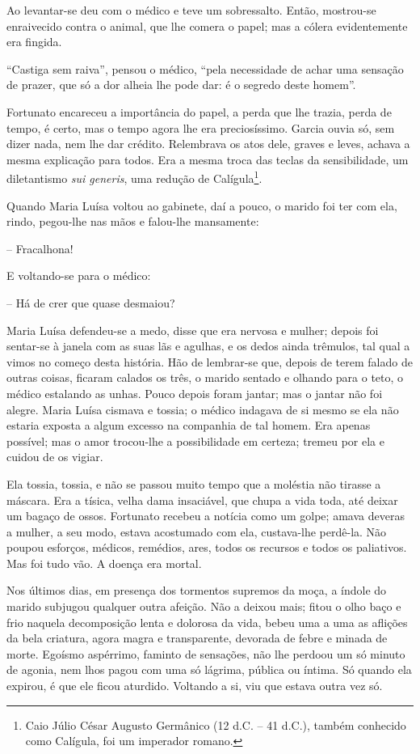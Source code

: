 Ao levantar-se deu com o médico e teve um sobressalto. Então, mostrou-se
enraivecido contra o animal, que lhe comera o papel; mas a cólera
evidentemente era fingida.

``Castiga sem raiva'', pensou o médico, ``pela necessidade de achar uma
sensação de prazer, que só a dor alheia lhe pode dar: é o segredo deste
homem''.

Fortunato encareceu a importância do papel, a perda que lhe trazia,
perda de tempo, é certo, mas o tempo agora lhe era preciosíssimo. Garcia
ouvia só, sem dizer nada, nem lhe dar crédito. Relembrava os atos dele,
graves e leves, achava a mesma explicação para todos. Era a mesma troca
das teclas da sensibilidade, um diletantismo \emph{sui generis}, uma
redução de Calígula\footnote{Caio Júlio César Augusto Germânico (12 d.C.
  -- 41 d.C.), também conhecido como Calígula, foi um imperador romano.}.

Quando Maria Luísa voltou ao gabinete, daí a pouco, o marido foi ter com
ela, rindo, pegou-lhe nas mãos e falou-lhe mansamente:

-- Fracalhona!

E voltando-se para o médico:

-- Há de crer que quase desmaiou?

Maria Luísa defendeu-se a medo, disse que era nervosa e mulher; depois
foi sentar-se à janela com as suas lãs e agulhas, e os dedos ainda
trêmulos, tal qual a vimos no começo desta história. Hão de lembrar-se
que, depois de terem falado de outras coisas, ficaram calados os três, o
marido sentado e olhando para o teto, o médico estalando as unhas. Pouco
depois foram jantar; mas o jantar não foi alegre. Maria Luísa cismava e
tossia; o médico indagava de si mesmo se ela não estaria exposta a algum
excesso na companhia de tal homem. Era apenas possível; mas o amor
trocou-lhe a possibilidade em certeza; tremeu por ela e cuidou de os
vigiar.

Ela tossia, tossia, e não se passou muito tempo que a moléstia não
tirasse a máscara. Era a tísica, velha dama insaciável, que chupa a vida
toda, até deixar um bagaço de ossos. Fortunato recebeu a notícia como um
golpe; amava deveras a mulher, a seu modo, estava acostumado com ela,
custava-lhe perdê-la. Não poupou esforços, médicos, remédios, ares,
todos os recursos e todos os paliativos. Mas foi tudo vão. A doença era
mortal.

Nos últimos dias, em presença dos tormentos supremos da moça, a índole
do marido subjugou qualquer outra afeição. Não a deixou mais; fitou o
olho baço e frio naquela decomposição lenta e dolorosa da vida, bebeu
uma a uma as aflições da bela criatura, agora magra e transparente,
devorada de febre e minada de morte. Egoísmo aspérrimo, faminto de
sensações, não lhe perdoou um só minuto de agonia, nem lhos pagou com
uma só lágrima, pública ou íntima. Só quando ela expirou, é que ele
ficou aturdido. Voltando a si, viu que estava outra vez só.

